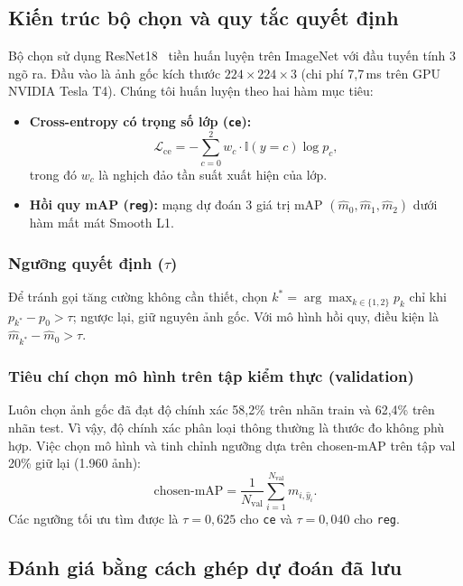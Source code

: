 \documentclass[runningheads]{llncs}
\begin{document}
\subsection{Kiến trúc bộ chọn và quy tắc quyết định}

Bộ chọn sử dụng ResNet18~\cite{heDeepResidualLearning2016} tiền huấn luyện trên ImageNet với đầu tuyến tính 3 ngõ ra. Đầu vào là ảnh gốc kích thước $224 \times 224 \times 3$ (chi phí 7,7\,ms trên GPU NVIDIA Tesla T4). Chúng tôi huấn luyện theo hai hàm mục tiêu:
\begin{itemize}
    \item \textbf{Cross-entropy có trọng số lớp (\texttt{ce}):}
          \begin{equation}
              \mathcal{L}_{\mathrm{ce}} = -\sum_{c=0}^2 w_c \cdot \mathbb{I}(y = c) \log p_c,
          \end{equation}
          trong đó $w_c$ là nghịch đảo tần suất xuất hiện của lớp.
    \item \textbf{Hồi quy mAP (\texttt{reg}):} mạng dự đoán 3 giá trị mAP $(\hat{m}_0, \hat{m}_1, \hat{m}_2)$ dưới hàm mất mát Smooth L1.
\end{itemize}

\subsubsection{Ngưỡng quyết định ($\tau$)}
Để tránh gọi tăng cường không cần thiết, chọn $k^* = \arg\max_{k \in \{1, 2\}} p_k$ chỉ khi $p_{k^*} - p_0 > \tau$; ngược lại, giữ nguyên ảnh gốc. Với mô hình hồi quy, điều kiện là $\hat{m}_{k^*} - \hat{m}_0 > \tau$.

\subsubsection{Tiêu chí chọn mô hình trên tập kiểm thực (validation)}
Luôn chọn ảnh gốc đã đạt độ chính xác 58,2\% trên nhãn train và 62,4\% trên nhãn test. Vì vậy, độ chính xác phân loại thông thường là thước đo không phù hợp. Việc chọn mô hình và tinh chỉnh ngưỡng dựa trên chosen-mAP trên tập val 20\% giữ lại (1.960 ảnh):
\begin{equation}
    \text{chosen-mAP} = \frac{1}{N_{\mathrm{val}}} \sum_{i=1}^{N_{\mathrm{val}}} m_{i, \hat{y}_i}.
\end{equation}
Các ngưỡng tối ưu tìm được là $\tau = 0{,}625$ cho \texttt{ce} và $\tau = 0{,}040$ cho \texttt{reg}.

\subsection{Đánh giá bằng cách ghép dự đoán đã lưu}
\end{document}
